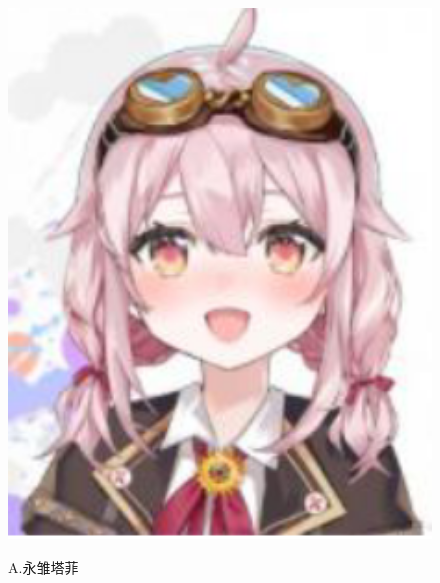 \documentclass[a4paper]{article}
\begin{document}
\begin{figure}[ht]
    \begin{minipage}{0.24\linewidth}
        \centerline{\includegraphics[width=1\textwidth]{taffy.PNG}}
        \centerline{A.永雏塔菲}
    \end{minipage}
    \begin{minipage}{0.24\linewidth}

\end{minipage}
\end{figure}
\end{document}
